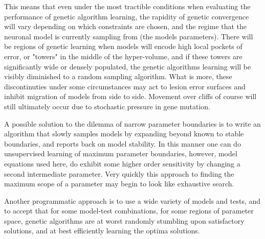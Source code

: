 This means that even under the most tractible conditions when evaluating the performance of genetic algorithm learning, the rapidity of genetic convergence will vary depending on which constraints are chosen, and the regime that the neuronal model is currently sampling from (the models parameters). There will be regions of genetic learning when models will encode high local pockets of error, or "towers" in the middle of the hyper-volume, and if these towers are significantly wide or densely populated, the genetic algorithms learning will be visibly diminished to a random sampling algorithm. What is more, these discontinuties under some circumstances may act to lesion error surfaces and inhibit migration of models from side to side. Movement over cliffs of course will still ultimately occur due to stochastic pressure in gene mutation.

A possible solution to the dilemma of narrow parameter boundaries is to write an algorithm that slowly samples models by expanding beyond known to stable boundaries, and reports back on model stability. In this manner one can do unsupervised learning of maximum parameter boundaries, however, model equations used here, do exhibit some higher order sensitivity by changing a second intermediate parameter. Very quickly this approach to finding the maximum scope of a parameter may begin to look like exhaustive search.

Another programmatic approach is to use a wide variety of models and tests, and to accept that for some model-test combinations, for some regions of parameter space, genetic algorithms are at worst randomly stumbling upon satisfactory solutions, and at best efficiently learning the optima solutions.
